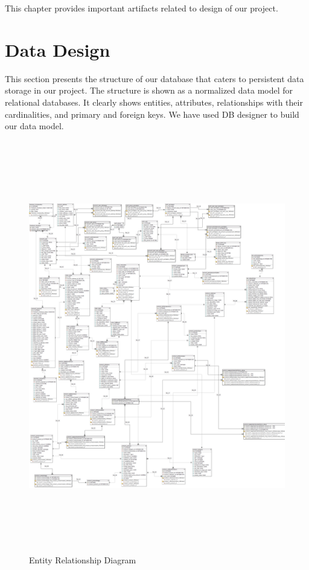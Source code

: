 
This chapter provides important artifacts related to design of our project.


\section{Data Design}

This section presents the structure of our database that caters to persistent data storage in our project. The structure is shown as a normalized data model for relational databases. It clearly shows entities, attributes, relationships with their cardinalities, and primary and foreign keys. We have used DB designer to build our data model.


\begin{figure}[H]
\includegraphics[width=15cm, height = 18cm, keepaspectratio]{images/PORS_ERD.png} 
\centering
\caption{Entity Relationship Diagram}
\label{erd}
\end{figure}
 
